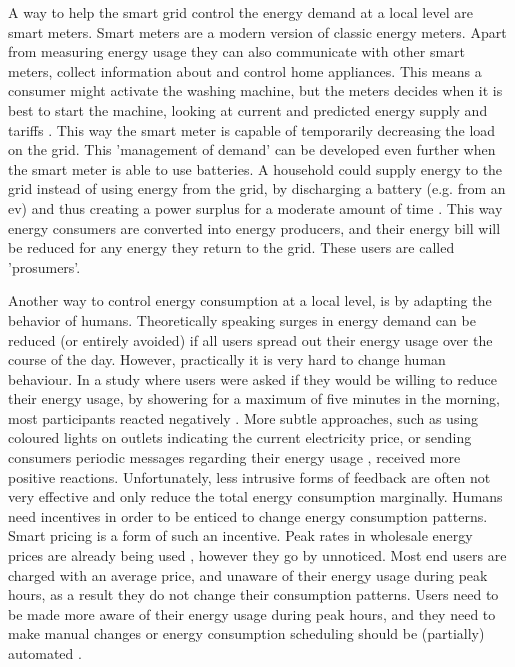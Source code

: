 A way to help the smart grid control the energy demand at a local level are smart meters. Smart meters are a modern version of classic energy meters. Apart from measuring energy usage they can also communicate with other smart meters, collect information about and control home appliances. This means a consumer might activate the washing machine, but the meters decides when it is best to start the machine, looking at current and predicted energy supply and tariffs  \cite{DepuruWangDevabhaktuni2011a}. This way the smart meter is capable of temporarily decreasing the load on the grid. This 'management of demand' can be developed even further when the smart meter is able to use batteries. A household could supply energy to the grid instead of using energy from the grid, by discharging a battery (e.g. from an \ac{ev}) and thus creating a power surplus for a moderate amount of time \cite{MwasiluJustoKimEtAl2014}. This way energy consumers are converted into energy producers, and their energy bill will be reduced for any energy they return to the grid. These users are called 'prosumers'.

Another way to control energy consumption at a local level, is by adapting the behavior of humans. Theoretically speaking surges in energy demand can be reduced (or entirely avoided) if all users spread out their energy usage over the course of the day. However, practically it is very hard to change human behaviour. In a study where users were asked if they would be willing to reduce their energy usage, by showering for a maximum of five minutes in the morning, most participants reacted negatively \cite{GouldenBedwellRennick-EgglestoneEtAl2014}. More subtle approaches, such as using coloured lights on outlets indicating the current electricity price, or sending consumers periodic messages regarding their energy usage \cite{AyresRasemanShih2012}, received more positive reactions. Unfortunately, less intrusive forms of feedback are often not very effective and only reduce the total energy consumption marginally. Humans need incentives in order to be enticed to change energy consumption patterns. Smart pricing is a form of such an incentive. Peak rates in wholesale energy prices are already being used \cite{SamadiMohsenian-RadSchoberEtAl2012}, however they go by unnoticed. Most end users are charged with an average price, and unaware of their energy usage during peak hours, as a result they do not change their consumption patterns. Users need to be made more aware of their energy usage during peak hours, and they need to make manual changes \cite{Mohsenian-RadLeon-Garcia2010} or energy consumption scheduling should be (partially) automated \cite{SamadiMohsenian-RadSchoberEtAl2012}.

